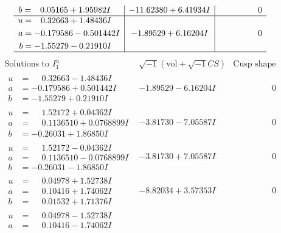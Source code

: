 \documentclass[1p]{elsarticle_modified}
\theoremstyle{definition}
\newcommand{\I}{\sqrt{-1}}
\begin{document}
$$\begin{array}{c|c|c}
\begin{aligned}
b &= \phantom{-}0.05165 + 1.95982 I\end{aligned}
 & -11.62380 + 6.41934 I & \phantom{-0.000000 } 0 \\ \hline\begin{aligned}
u &= \phantom{-}0.32663 + 1.48436 I \\
a &= -0.179586 - 0.501442 I \\
b &= -1.55279 - 0.21910 I\end{aligned}
 & -1.89529 + 6.16204 I & \phantom{-0.000000 } 0\\
 \hline 
 \end{array}$$\newpage$$\begin{array}{c|c|c}  
\text{Solutions to }I^u_{1}& \I (\text{vol} + \sqrt{-1}CS) & \text{Cusp shape}\\
 \hline 
\begin{aligned}
u &= \phantom{-}0.32663 - 1.48436 I \\
a &= -0.179586 + 0.501442 I \\
b &= -1.55279 + 0.21910 I\end{aligned}
 & -1.89529 - 6.16204 I & \phantom{-0.000000 } 0 \\ \hline\begin{aligned}
u &= \phantom{-}1.52172 + 0.04362 I \\
a &= \phantom{-}0.1136510 + 0.0768899 I \\
b &= -0.26031 + 1.86850 I\end{aligned}
 & -3.81730 - 7.05587 I & \phantom{-0.000000 } 0 \\ \hline\begin{aligned}
u &= \phantom{-}1.52172 - 0.04362 I \\
a &= \phantom{-}0.1136510 - 0.0768899 I \\
b &= -0.26031 - 1.86850 I\end{aligned}
 & -3.81730 + 7.05587 I & \phantom{-0.000000 } 0 \\ \hline\begin{aligned}
u &= \phantom{-}0.04978 + 1.52738 I \\
a &= \phantom{-}0.10416 + 1.74062 I \\
b &= \phantom{-}0.01532 + 1.71376 I\end{aligned}
 & -8.82034 + 3.57353 I & \phantom{-0.000000 } 0 \\ \hline\begin{aligned}
u &= \phantom{-}0.04978 - 1.52738 I \\
a &= \phantom{-}0.10416 - 1.74062 I \\

\end{aligned}
\end{array}$$
\end{document}
